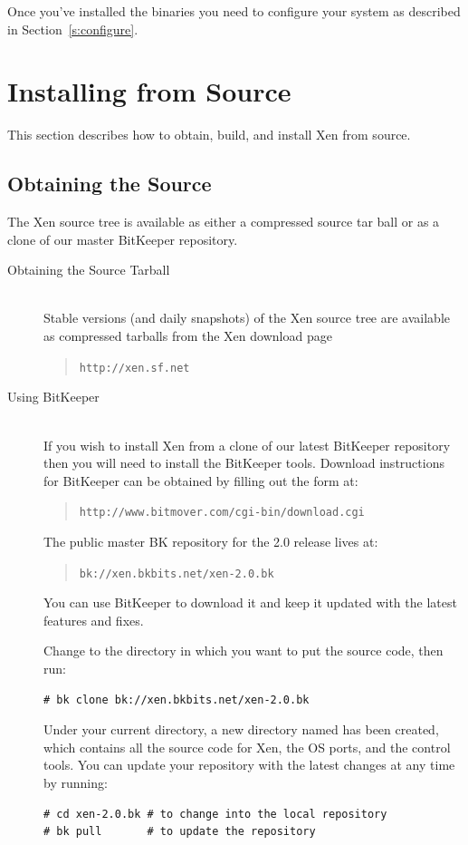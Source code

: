 \documentclass[11pt,twoside,final,openright]{report}
\begin{document}
Once you've installed the binaries you need to configure
your system as described in Section~\ref{s:configure}. 

\section{Installing from Source} 

This section describes how to obtain, build, and install 
Xen from source. 

\subsection{Obtaining the Source} 

The Xen source tree is available as either a compressed source tar
ball or as a clone of our master BitKeeper repository.

\begin{description} 
\item[Obtaining the Source Tarball]\mbox{} \\  
Stable versions (and daily snapshots) of the Xen source tree are
available as compressed tarballs from the Xen download page
\begin{quote} 
{\tt http://xen.sf.net}
\end{quote} 

\item[Using BitKeeper]\mbox{} \\  
If you wish to install Xen from a clone of our latest BitKeeper
repository then you will need to install the BitKeeper tools.
Download instructions for BitKeeper can be obtained by filling out the
form at:

\begin{quote} 
{\tt http://www.bitmover.com/cgi-bin/download.cgi}
\end{quote}
The public master BK repository for the 2.0 release lives at: 
\begin{quote}
{\tt bk://xen.bkbits.net/xen-2.0.bk}  
\end{quote} 
You can use BitKeeper to
download it and keep it updated with the latest features and fixes.

Change to the directory in which you want to put the source code, then
run:
\begin{verbatim}
# bk clone bk://xen.bkbits.net/xen-2.0.bk
\end{verbatim}

Under your current directory, a new directory named 
has been created, which contains all the source code for Xen, the OS
ports, and the control tools. You can update your repository with the
latest changes at any time by running:
\begin{verbatim}
# cd xen-2.0.bk # to change into the local repository
# bk pull       # to update the repository
\end{verbatim}
\end{description} 
\end{document}
